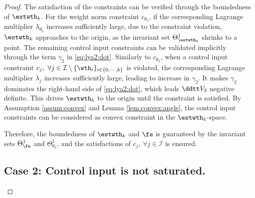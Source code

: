 \documentclass[journal]{IEEEtran}
\begin{document}
\begin{proof}
The satisfaction of the constraints can be verified through the boundedness of $\estwth_k$.
For the weight norm constraint $c_{\theta_k}$, if the corresponding Lagrange multiplier $\lambda_{\theta_k}$ increases sufficiently large, due to the constraint violation, $\estwth_k$ approaches to the origin, as the invariant set $\Theta_{\estwth_k}^{1}$ shrinks to a point.
The remaining control input constraints can be validated implicitly through the term ${\gamma}_2$ in \eqref{eq:lya2:dot}.
Similarly to $c_{\theta_k}$, when a control input constraint $c_j,\ \forall j\in\mathcal{I}\setminus \{\wth_i\}_{i\in\{0,\cdots,k\}}$ is violated, the corresponding Lagrange multiplier $\lambda_j$ increases sufficiently large, leading to increase in ${\gamma}_2$.
It makes ${\gamma}_2$ dominates the right-hand side of \eqref{eq:lya2:dot}, which leads $\ddtt V_2$ negative definite.
This drives $\estwth_k$ to the origin until the constraint is satisfied.
By Assumption \ref{assum:convex} and Lemma \ref{lem:convex:angle}, the control input constraints can be considered as convex constraint in the $\estwth_k$-space.

Therefore, the boundedness of $\estwth_k$ and $\fe$ is guaranteed by the invariant sets $\Theta_{\fe}^{1}$ and $\Theta_{\theta_k}^{1}$, and the satisfactions of $c_j,\ \forall j\in\mathcal{I}$ is ensured.

\subsection*{Case 2: Control input is not saturated.}


\end{proof}
\end{document}

